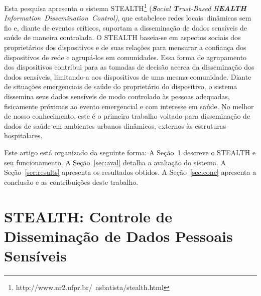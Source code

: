 \documentclass[12pt]{article}
\begin{document}
Esta pesquisa apresenta o sistema \mbox{STEALTH}\footnote{http://www.nr2.ufpr.br/~asbatista/stealth.html} (\textit{\textbf{S}ocial \textbf{T}rust-Based H\textbf{EALTH} \mbox{Information Dissemination Control)}}, que estabelece redes locais~dinâmicas sem fio e, diante de eventos críticos, suportam a disseminação de dados sensíveis de saúde de maneira controlada. O \mbox{STEALTH} baseia-se em aspectos sociais dos proprietários dos dispositivos e de suas relações para mensurar a confiança dos dispositivos de rede e agrupá-los em comunidades. Essa forma de agrupamento dos dispositivos contribui para as tomadas de decisão acerca da disseminação dos dados sensíveis, limitando-a aos dispositivos de uma mesma comunidade. Diante de situações emergenciais de saúde do proprietário do dispositivo, o sistema dissemina seus dados sensíveis de modo controlado às pessoas adequadas, fisicamente próximas ao evento emergencial e com interesse em saúde. No melhor de nosso conhecimento, este é o primeiro trabalho voltado para disseminação de dados de saúde em ambientes urbanos dinâmicos, externos às estruturas hospitalares. 

Este artigo está organizado da seguinte forma: A Seção~\ref{sec:sistema} descreve o \mbox{STEALTH} e seu funcionamento. A Seção~\ref{sec:aval} detalha a avaliação do sistema. A Seção~\ref{sec:results} apresenta os resultados obtidos. A Seção~\ref{sec:conc} apresenta a conclusão e as contribuições deste trabalho.

\vspace{-0.2cm}

\section{STEALTH: Controle de Disseminação de Dados Pessoais Sensíveis} \label{sec:sistema}
\end{document}

